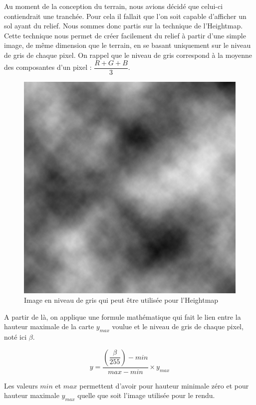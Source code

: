 \documentclass[11pt]{report}
\begin{document}
Au moment de la conception du terrain, nous avions décidé que celui-ci contiendrait une tranchée. Pour cela il fallait que l'on soit capable d'afficher un sol ayant du relief. Nous sommes donc partis sur la technique de l'Heightmap. Cette technique nous permet de créer facilement du relief à partir d'une simple image, de même dimension que le terrain, en se basant uniquement sur le niveau de gris de chaque pixel. On rappel que le niveau de gris correspond à la moyenne des composantes d'un pixel : \( \dfrac{R + G + B}{3} \). 

\begin{figure}[htbp]
\centering
\includegraphics[scale=0.6]{heightmap-texture.png}
\caption{Image en niveau de gris qui peut être utilisée pour l'Heightmap}
\label{fig-heightmap-texture}
\end{figure}

A partir de là, on applique une formule mathématique qui fait le lien entre la hauteur maximale de la carte \( y_{max} \) voulue et le niveau de gris de chaque pixel, noté ici \( \beta \).

\[
y = \dfrac{\left(\dfrac{\beta}{255}\right) - min}{max - min} \times y_{max}
\]

Les valeurs \( min \) et \( max \) permettent d'avoir pour hauteur minimale zéro et pour hauteur maximale \( y_{max} \) quelle que soit l'image utilisée pour le rendu.
\end{document}
